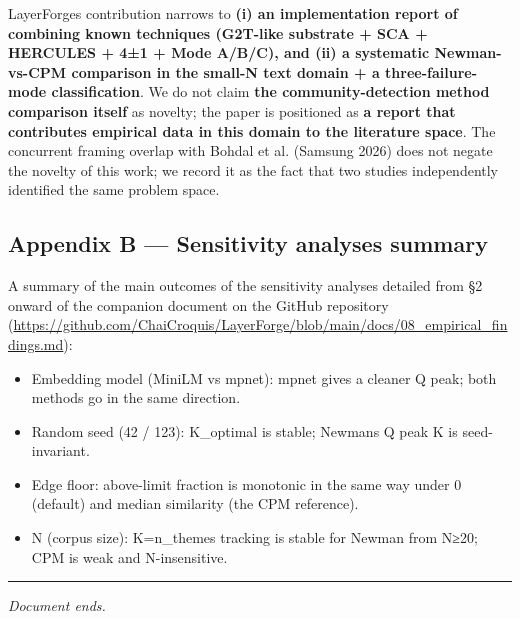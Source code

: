 \documentclass[
]{article}
\providecommand{\tightlist}{%
  \setlength{\itemsep}{0pt}\setlength{\parskip}{0pt}}
\begin{document}
LayerForge\textquotesingle s contribution narrows to \textbf{(i) an
implementation report of combining known techniques (G2T-like substrate
+ SCA + HERCULES + 4±1 + Mode A/B/C), and (ii) a systematic
Newman-vs-CPM comparison in the small-N text domain + a
three-failure-mode classification}. We do not claim \textbf{the
community-detection method comparison itself} as novelty; the paper is
positioned as \textbf{a report that contributes empirical data in this
domain to the literature space}. The concurrent framing overlap with
Bohdal et al. (Samsung 2026) does not negate the novelty of this work;
we record it as the fact that two studies independently identified the
same problem space.

\subsection{Appendix B --- Sensitivity analyses
summary}\label{appendix-b--sensitivity-analyses-summary}

A summary of the main outcomes of the sensitivity analyses detailed from
§2 onward of the companion document on the GitHub repository
(\url{https://github.com/ChaiCroquis/LayerForge/blob/main/docs/08_empirical_findings.md}):

\begin{itemize}
\tightlist
\item
  Embedding model (MiniLM vs mpnet): mpnet gives a cleaner Q peak; both
  methods go in the same direction.
\item
  Random seed (42 / 123): K\_optimal is stable; Newman\textquotesingle s
  Q peak K is seed-invariant.
\item
  Edge floor: above-limit fraction is monotonic in the same way under 0
  (default) and median similarity (the CPM reference).
\item
  N (corpus size): K=n\_themes tracking is stable for Newman from N≥20;
  CPM is weak and N-insensitive.
\end{itemize}

\begin{center}\rule{0.5\linewidth}{0.5pt}\end{center}

\emph{Document ends.}
\end{document}

